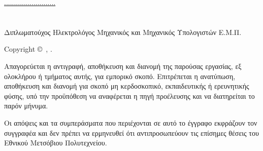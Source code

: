 
\blankpage

\thispagestyle{empty}

\vspace*{\fill}

\noindent\underline{..........................}\\
\myAuthor\\
\myDeclarationDate\\
Διπλωματούχος Ηλεκτρολόγος Μηχανικός και Μηχανικός Υπολογιστών Ε.Μ.Π.

\vspace{1cm}

\textenglish{Copyright} \copyright\ \myAuthor, \myCopyrightYear.

\vspace{0.5cm}

\noindent
Απαγορεύεται η αντιγραφή, αποθήκευση και διανομή της παρούσας εργασίας, εξ ολοκλήρου ή
τμήματος αυτής, για εμπορικό σκοπό. Επιτρέπεται η ανατύπωση, αποθήκευση και διανομή για
σκοπό μη κερδοσκοπικό, εκπαιδευτικής ή ερευνητικής φύσης, υπό την προϋπόθεση να αναφέρεται
η πηγή προέλευσης και να διατηρείται το παρόν μήνυμα.

\vspace{0.5cm}

\noindent
Οι απόψεις και τα συμπεράσματα που περιέχονται σε αυτό το έγγραφο εκφράζουν τον συγγραφέα
και δεν πρέπει να ερμηνευθεί ότι αντιπροσωπεύουν τις επίσημες θέσεις του Εθνικού Μετσόβιου Πολυτεχνείου.

\vspace{0.5cm}

\newpage
